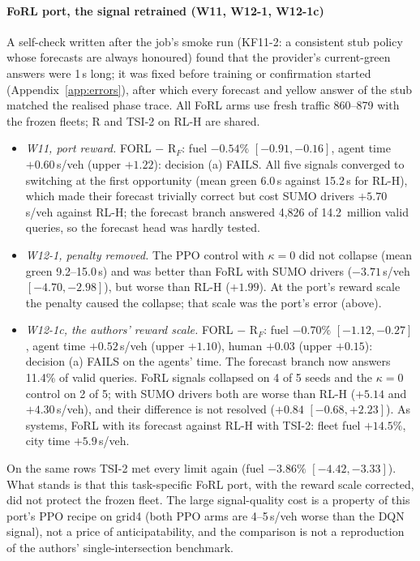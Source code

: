 \paragraph{FoRL port, the signal retrained (W11, W12-1, W12-1c)}
A self-check written after the job's smoke run (KF11-2: a consistent stub policy whose forecasts are always honoured) found that the
provider's current-green answers were 1\,s long; it was fixed before training or confirmation started (Appendix~\ref{app:errors}),
after which every forecast and yellow answer of the stub matched the realised phase trace. All FoRL arms use fresh traffic 860--879
with the frozen fleets; R and TSI-2 on RL-H are shared.
\begin{itemize}\setlength\itemsep{1pt}
\item \emph{W11, port reward.} FORL $-$ R$_F$: fuel $-0.54\%$ $[-0.91,-0.16]$, agent time $+0.60$\,s/veh (upper $+1.22$): decision (a)
FAILS. All five signals converged to switching at the first opportunity (mean green 6.0\,s against 15.2\,s for RL-H), which made their
forecast trivially correct but cost SUMO drivers $+5.70$\,s/veh against RL-H; the forecast branch answered 4,826 of 14.2~million valid
queries, so the forecast head was hardly tested.
\item \emph{W12-1, penalty removed.} The PPO control with $\kappa=0$ did not collapse (mean green 9.2--15.0\,s) and was better than
FoRL with SUMO drivers ($-3.71$\,s/veh $[-4.70,-2.98]$), but worse than RL-H ($+1.99$). At the port's reward scale the penalty caused the
collapse; that scale was the port's error (above).
\item \emph{W12-1c, the authors' reward scale.} FORL $-$ R$_F$: fuel $-0.70\%$ $[-1.12,-0.27]$, agent time $+0.52$\,s/veh (upper
$+1.10$), human $+0.03$ (upper $+0.15$): decision (a) FAILS on the agents' time. The forecast branch now answers 11.4\% of valid queries.
FoRL signals collapsed on 4 of 5 seeds and the $\kappa=0$ control on 2 of 5; with SUMO drivers both are worse than RL-H ($+5.14$ and
$+4.30$\,s/veh), and their difference is not resolved ($+0.84$ $[-0.68,+2.23]$). As systems, FoRL with its forecast against RL-H with
TSI-2: fleet fuel $+14.5\%$, city time $+5.9$\,s/veh.
\end{itemize}
On the same rows TSI-2 met every limit again (fuel $-3.86\%$ $[-4.42,-3.33]$). What stands is that this task-specific FoRL port, with
the reward scale corrected, did not protect the frozen fleet. The large signal-quality cost is a property of this port's PPO recipe on
grid4 (both PPO arms are 4--5\,s/veh worse than the DQN signal), not a price of anticipatability, and the comparison is not a
reproduction of the authors' single-intersection benchmark.


